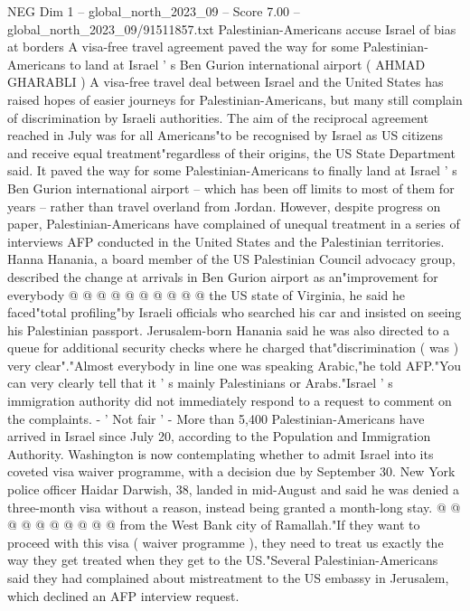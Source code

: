 \begin{textsample}{NEG Dim 1 – global\_north\_2023\_09 – Score 7.00 – global\_north\_2023\_09/91511857.txt}  \label{ex:f1_neg_098}
Palestinian-Americans accuse Israel of bias at borders A visa-free travel agreement paved the way for some Palestinian-Americans to land at Israel ' s Ben Gurion international airport ( AHMAD GHARABLI ) A visa-free travel deal between Israel and the United States has raised hopes of easier journeys for Palestinian-Americans, but many still complain of discrimination by Israeli authorities.
The aim of the reciprocal agreement reached in July was for all Americans"to be recognised by Israel as US citizens and receive equal treatment"regardless of their origins, the US State Department said.
It paved the way for some Palestinian-Americans to finally land at Israel ' s Ben Gurion international airport -- which has been off limits to most of them for years -- rather than travel overland from Jordan.
However, despite progress on paper, Palestinian-Americans have complained of unequal treatment in a series of interviews AFP conducted in the United States and the Palestinian territories.
Hanna Hanania, a board member of the US Palestinian Council advocacy group, described the change at arrivals in Ben Gurion airport as an"improvement for everybody @ @ @ @ @ @ @ @ @ @ the US state of Virginia, he said he faced"total profiling"by Israeli officials who searched his car and insisted on seeing his Palestinian passport.
Jerusalem-born Hanania said he was also directed to a queue for additional security checks where he charged that"discrimination ( was ) very clear"."Almost everybody in line one was speaking Arabic,"he told AFP."You can very clearly tell that it ' s mainly Palestinians or Arabs."Israel ' s immigration authority did not immediately respond to a request to comment on the complaints. - ' Not fair ' - More than 5,400 Palestinian-Americans have arrived in Israel since July 20, according to the Population and Immigration Authority.
Washington is now contemplating whether to admit Israel into its coveted visa waiver programme, with a decision due by September 30.
New York police officer Haidar Darwish, 38, landed in mid-August and said he was denied a three-month visa without a reason, instead being granted a month-long stay. @ @ @ @ @ @ @ @ @ @ from the West Bank city of Ramallah."If they want to proceed with this visa ( waiver programme ), they need to treat us exactly the way they get treated when they get to the US."Several Palestinian-Americans said they had complained about mistreatment to the US embassy in Jerusalem, which declined an AFP interview request.

\end{textsample}
